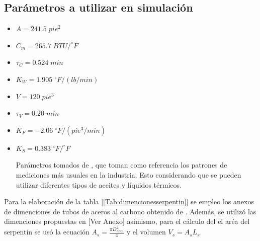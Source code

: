 \documentclass[12pt,letterpaper]{article}     %
\begin{document}
\subsection{Parámetros a utilizar en simulación}

\begin{itemize}
   
 \item $A=241.5 \; pie^2$

 \item $C_m = 265.7 \; BTU/ ^{\circ}F$


\item $\tau _C = 0.524 \; min$

\item $K_W = 1.905 \; ^{\circ}F/(lb/min)$


\item $V = 120 \; pie^3$

\item $\tau _V = 0.20 \; min$

\item $K_F = -2.06  \; ^{\circ}F/(pie^3 /min)$

\item $K_S = 0.383 \; ^{\circ}F/^{\circ}F$

Parámetros tomados de \cite{Natividad}, que toman como referencia los patrones de mediciones más usuales en la industria. Esto considerando que se pueden utilizar diferentes tipos de aceites y líquidos térmicos.
\end{itemize}

\newpage

Para la elaboración de la tabla [\ref{Tab:dimencionesserpentin}] se empleo los anexos de dimenciones de tubos de aceros al carbono obtenido de  \cite{vemacero}. Además, se utilizó las dimenciones propuestas en \cite{Burbano} [Ver Anexo] asimismo, para el cálculo del el aréa del serpentín se usó la ecuación $A_{s} = \frac{\pi D^2_{nom}}{4}$ y el volumen $V_{s} = A_{s}L_{s}$.
\end{document}
